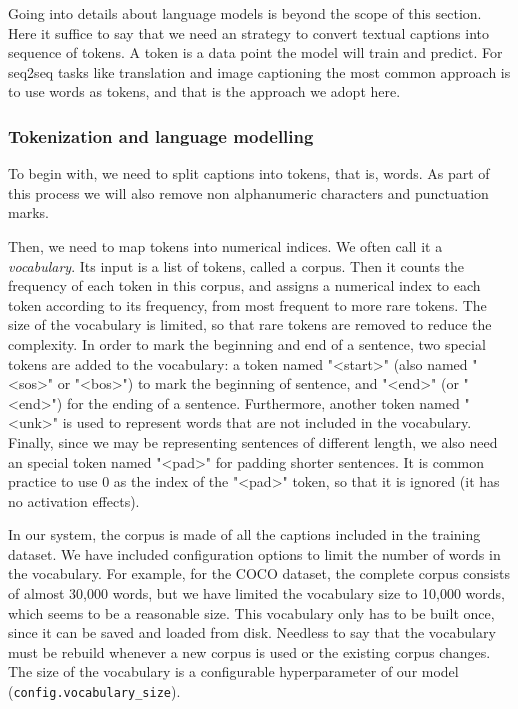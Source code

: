 Going into details about language models is beyond the scope of this section. Here it suffice to say that we need an strategy to convert textual captions into sequence of tokens. A token is a data point the model will train and predict. For seq2seq tasks like translation and image captioning the most common approach is to use words as tokens, and that is the approach we adopt here.

\subsubsection{Tokenization and language modelling}\label{subsec:tokenization}

To begin with, we need to split captions into tokens, that is, words. As part of this process we will also remove non alphanumeric characters and punctuation marks. 

Then, we need to map tokens into numerical indices. We often call it a \textit{vocabulary}. Its input is a list of tokens, called a corpus. Then it counts the frequency of each token in this corpus, and assigns a numerical index to each token according to its frequency, from most frequent to more rare tokens. The size of the vocabulary is limited, so that rare tokens are removed to reduce the complexity. In order to mark the beginning and end of a sentence, two special tokens are added to the vocabulary: a token named "<start>" (also  named "<sos>" or "<bos>") to mark the beginning of sentence, and "<end>" (or "<end>") for the ending of a sentence. Furthermore, another token named "<unk>" is used to represent words that are not included in the vocabulary. Finally, since we may be representing sentences of different length, we also need an special token named "<pad>" for padding shorter sentences. It is common practice to use 0 as the index of the "<pad>" token, so that it is ignored (it has no activation effects).  

In our system, the corpus is made of all the captions included in the training dataset. We have included configuration options to limit the number of words in the vocabulary. For example, for the COCO dataset, the complete corpus consists of almost 30,000 words, but we have limited the vocabulary size to 10,000 words, which seems to be a reasonable size. This vocabulary only has to be built once, since it can be saved and loaded from disk. Needless to say that the vocabulary must be rebuild whenever a new corpus is used or the existing corpus changes. The size of the vocabulary is a configurable hyperparameter of our model (\lstinline{config.vocabulary_size}).

